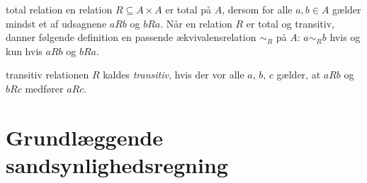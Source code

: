 \begin{mydescription}
  \item[total relation]
    en relation $R \subseteq A\times A$ er total på $A$, dersom for alle $a,b\in A$ gælder mindst et af udsagnene $aR b$ og $bR a$.
    Når en relation $R$ er  total og transitiv, danner følgende definition en passende ækvivalensrelation $\sim_R$ på $A$: 
    $a \sim_R b$ hvis og kun hvis $aRb$ og $bRa$.

  \item[transitiv]
    relationen $R$ kaldes \emph{transitiv}, hvis der vor alle $a$, $b$, $c$ gælder, at $aR b$ og $bRc$ medfører $aR c$. 


\end{mydescription}

\section{Grundlæggende sandsynlighedsregning}

\newcommand{\SampleSpace}{\mathcal S}
\newcommand{\Sample}{s}
\renewcommand{\prob}[1]{\Pr(#1)}
\newcommand{\Exp}[1]{E[#1]}

